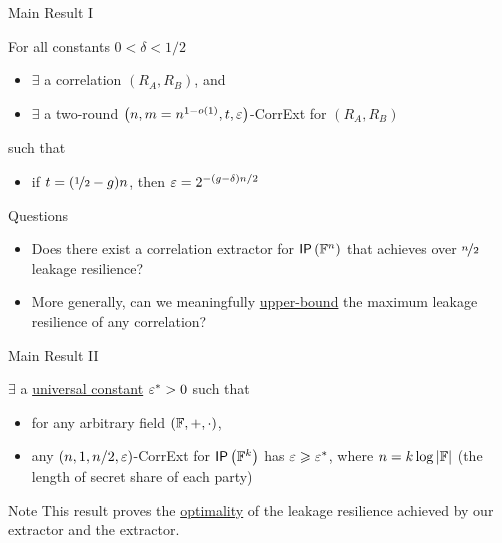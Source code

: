\begin{frame}{Main Result I}
	\begin{theorem}
	\label{thm:construction}
	For all constants $0<\delta<1/2$
	\begin{itemize}
		\item $ \exists $ a correlation $(R_A,R_B)$, and
		\item $ \exists $ a two-round $\left(n,m = n^{1-o(1)},t,\varepsilon\right)$-CorrExt for $(R_A,R_B)$
	\end{itemize}
	such that 
	\begin{itemize}
		\item if $t=(\nicefrac12-g)n$, then $\varepsilon=2^{-(g-\delta)n/2}$
	\end{itemize} 
	\end{theorem}
	\pause
	{
	\begin{block}{Questions}
		\begin{itemize}
		\item Does there exist a correlation extractor for $ \IP[\bbF^n] $ that achieves over $ \nicefrac{n}{2} $ leakage resilience? \pause
		\item More generally, can we meaningfully \underline{upper-bound} the maximum leakage resilience of any correlation? 
		\end{itemize}
	\end{block}
	}
\end{frame}

\begin{frame}{Main Result II}
	\begin{theorem}
	\label{thm:hardness} 
	$ \exists $ a \underline{universal constant} $\varepsilon^*>0$ such that
	\begin{itemize}
		\item for any arbitrary field $({\mathbb F},+,\cdot)$,
		\item any $(n,1,%
		n/2,\eps)$-CorrExt for $ \IP [\bbF^k] $ has $\varepsilon\geqslant\varepsilon^*$, where $n=k\log\left\vert{\ensuremath{{\mathbb F}}}\right\vert$ (the length of secret share of each party)  
	\end{itemize}
\end{theorem}

{
\begin{block}{Note}
	This result proves the \underline{optimality} of the leakage resilience achieved by our extractor and the \cite{C:GIMS15} extractor.
\end{block}}

\end{frame}